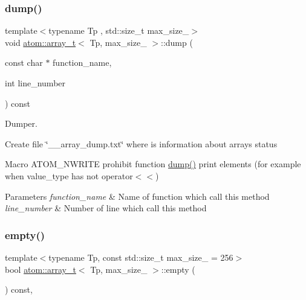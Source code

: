 \subsubsection{\texorpdfstring{dump()}{dump()}}
{\footnotesize\ttfamily template$<$typename Tp , std\+::size\+\_\+t max\+\_\+size\+\_\+$>$ \\
void \hyperlink{classatom_1_1array__t}{atom\+::array\+\_\+t}$<$ Tp, max\+\_\+size\+\_\+ $>$\+::dump (\begin{DoxyParamCaption}\item[{const char $\ast$}]{function\+\_\+name,  }\item[{int}]{line\+\_\+number }\end{DoxyParamCaption}) const\hspace{0.3cm}{\ttfamily [private]}}



Dumper. 

Create file \char`\"{}\+\_\+\+\_\+array\+\_\+dump.\+txt\char`\"{} where is information about array\textquotesingle{}s status

Macro A\+T\+O\+M\+\_\+\+N\+W\+R\+I\+TE prohibit function \hyperlink{classatom_1_1array__t_a3e133e59958e8638b0f6d7a74b9890d6}{dump()} print elements (for example when value\+\_\+type has not operator$<$$<$) 
\begin{DoxyParams}{Parameters}
{\em function\+\_\+name} & Name of function which call this method \\
\hline
{\em line\+\_\+number} & Number of line which call this method \\
\hline
\end{DoxyParams}
\mbox{\label{classatom_1_1array__t_aac24cc1d7dab76ac0bf394aaa8699e27}} 
\subsubsection{\texorpdfstring{empty()}{empty()}}
{\footnotesize\ttfamily template$<$typename Tp, const std\+::size\+\_\+t max\+\_\+size\+\_\+ = 256$>$ \\
bool \hyperlink{classatom_1_1array__t}{atom\+::array\+\_\+t}$<$ Tp, max\+\_\+size\+\_\+ $>$\+::empty (\begin{DoxyParamCaption}{ }\end{DoxyParamCaption}) const\hspace{0.3cm}{\ttfamily [inline]}, {\ttfamily [noexcept]}}



